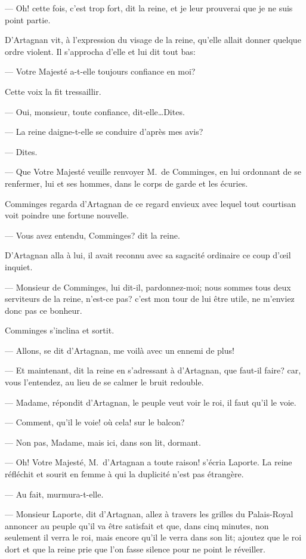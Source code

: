 — Oh! cette fois, c'est trop fort, dit la reine, et je leur prouverai que je ne suis point partie.

D'Artagnan vit, à l'expression du visage de la reine, qu'elle allait donner quelque ordre violent. Il s'approcha d'elle et lui dit tout bas:

— Votre Majesté a-t-elle toujours confiance en moi?

Cette voix la fit tressaillir.

— Oui, monsieur, toute confiance, dit-elle\dots Dites.

— La reine daigne-t-elle se conduire d'après mes avis?

— Dites.

— Que Votre Majesté veuille renvoyer M.~de Comminges, en lui ordonnant de se renfermer, lui et ses hommes, dans le corps de garde et les écuries.

Comminges regarda d'Artagnan de ce regard envieux avec lequel tout courtisan voit poindre une fortune nouvelle.

— Vous avez entendu, Comminges? dit la reine.

D'Artagnan alla à lui, il avait reconnu avec sa sagacité ordinaire ce coup d'œil inquiet.

— Monsieur de Comminges, lui dit-il, pardonnez-moi; nous sommes tous deux serviteurs de la reine, n'est-ce pas? c'est mon tour de lui être utile, ne m'enviez donc pas ce bonheur.

Comminges s'inclina et sortit.

— Allons, se dit d'Artagnan, me voilà avec un ennemi de plus!

— Et maintenant, dit la reine en s'adressant à d'Artagnan, que faut-il faire? car, vous l'entendez, au lieu de se calmer le bruit redouble.

— Madame, répondit d'Artagnan, le peuple veut voir le roi, il faut qu'il le voie.

— Comment, qu'il le voie! où cela! sur le balcon?

— Non pas, Madame, mais ici, dans son lit, dormant.

— Oh! Votre Majesté, M.~d'Artagnan a toute raison! s'écria Laporte.
La reine réfléchit et sourit en femme à qui la duplicité n'est pas étrangère.

— Au fait, murmura-t-elle.

— Monsieur Laporte, dit d'Artagnan, allez à travers les grilles du Palais-Royal annoncer au peuple qu'il va être satisfait et que, dans cinq minutes, non seulement il verra le roi, mais encore qu'il le verra dans son lit; ajoutez que le roi dort et que la reine prie que l'on fasse silence pour ne point le réveiller.


